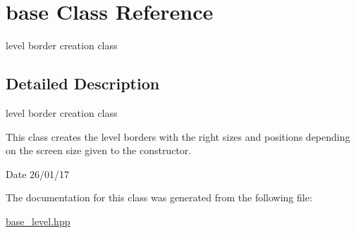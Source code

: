 \hypertarget{classbase}{}\section{base Class Reference}
\label{classbase}


level border creation class  




\subsection{Detailed Description}
level border creation class 

This class creates the level borders with the right sizes and positions depending on the screen size given to the constructor.

\begin{DoxyDate}{Date}
26/01/17 
\end{DoxyDate}


The documentation for this class was generated from the following file\+:\begin{DoxyCompactItemize}
\item 
\hyperlink{base__level_8hpp}{base\+\_\+level.\+hpp}\end{DoxyCompactItemize}
